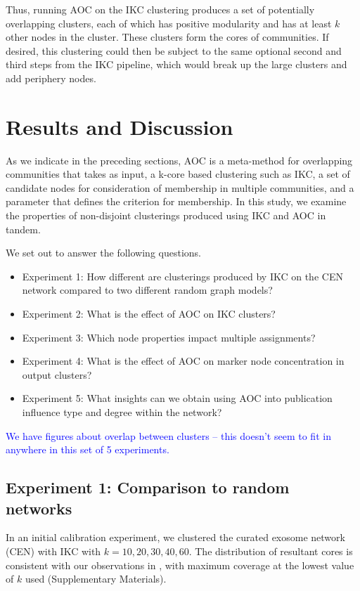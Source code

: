\documentclass[11pt, oneside]{article}   	%
\begin{document}
Thus, running   AOC on the IKC clustering produces a set of potentially overlapping clusters, each of which has positive modularity and has at least $k$ other nodes in the cluster.
These clusters form the cores of communities.  If desired, this clustering could then be subject to the same optional second and third steps from the IKC pipeline, which would
break up the large clusters and add periphery nodes. 

\section{Results and Discussion}

As we indicate in the preceding sections, AOC is a meta-method for overlapping communities that takes as input, a k-core based clustering such as IKC, a set of candidate nodes for consideration of membership in multiple communities, and a parameter that defines the criterion for membership. In this study, we examine the properties of non-disjoint clusterings produced using IKC and AOC in tandem. 

We set out to answer the following questions.

\begin{itemize}
\item Experiment 1: How different are clusterings  produced by IKC on the CEN network compared to two different random graph models?
\item Experiment 2:  What is the effect of AOC on IKC clusters?
\item Experiment 3:  Which node properties impact multiple assignments?
\item Experiment 4:  What is the effect of AOC on marker node concentration in output clusters? 
\item Experiment 5:  What insights can we obtain using AOC into publication influence type and degree within the network?
\end{itemize}

\textcolor{blue}{We have figures about overlap between clusters -- this doesn't seem to fit in anywhere in this set of 5 experiments.}

\subsection{Experiment 1: Comparison to random networks} In an initial calibration experiment, we clustered the curated exosome network (CEN) with IKC with  $k = {10,20,30,40, 60}$. The distribution of resultant cores is consistent with our observations in \cite{Wedell2022}, with maximum coverage at the lowest value of $k$ used (Supplementary Materials). 
\end{document}
